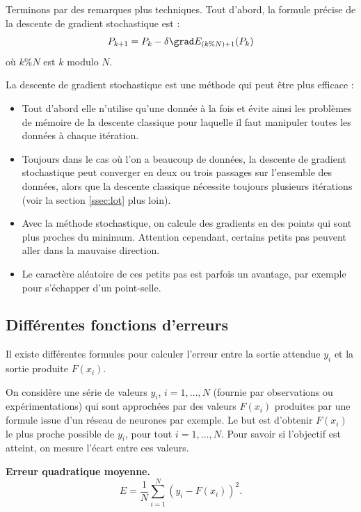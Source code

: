 \documentclass[11pt,class=report,crop=false]{standalone}
\begin{document}
Terminons par des remarques plus techniques.
Tout d'abord, la formule précise de la descente de gradient stochastique est :
$$P_{k+1} = P_k - \delta \grad E_{(k \% N)+1} (P_k)$$
où $k \% N$ est \og{}$k$ modulo $N$\fg{}.



La descente de gradient stochastique est une méthode qui peut être plus efficace : 
\begin{itemize}
  \item Tout d'abord elle n'utilise qu'une donnée à la fois et évite ainsi les problèmes de mémoire de la descente classique pour laquelle il faut manipuler toutes les données à chaque itération.
  \item Toujours dans le cas où l'on a beaucoup de données, la descente de gradient stochastique peut converger en deux ou trois passages sur l'ensemble des données, alors que la descente classique nécessite toujours plusieurs itérations (voir la section \ref{ssec:lot} plus loin).
  \item Avec la méthode stochastique, on calcule des gradients en des points qui sont plus proches du minimum. Attention cependant, certains petits pas peuvent aller dans la mauvaise direction.
  \item Le caractère aléatoire de ces petits pas est parfois un avantage, par exemple pour s'échapper d'un point-selle.
\end{itemize}






\subsection{Différentes fonctions d'erreurs}

Il existe différentes formules pour calculer l'erreur entre la sortie attendue $y_i$ et la sortie produite $F(x_i)$.

On considère une série de valeurs $y_i$, $i=1,\ldots,N$ (fournie par observations ou expérimentations) qui sont approchées par des valeurs $F(x_i)$ produites par une formule issue d'un réseau de neurones par exemple.
Le but est d'obtenir $F(x_i)$ le plus proche possible de $y_i$, pour tout $i=1,\ldots,N$. Pour savoir si l'objectif est atteint, on mesure l'écart entre ces valeurs.

\textbf{Erreur quadratique moyenne.}
$$E = \frac{1}{N} \sum_{i=1}^N (y_i-F(x_i))^2.$$
\end{document}
